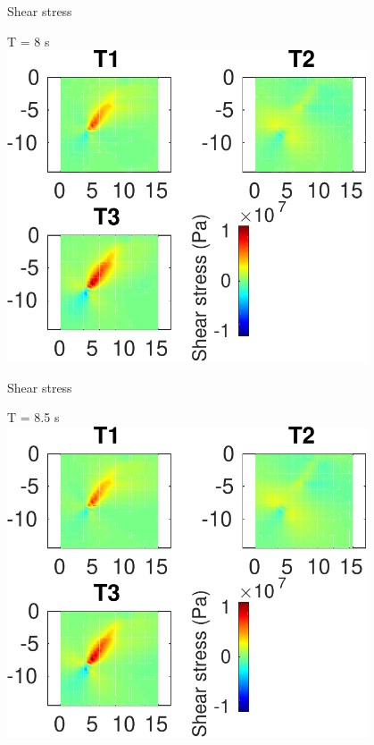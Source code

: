 \documentclass{beamer}
\begin{document}
\begin{frame}
 {Shear stress}
 
 \centering \Large T = 8 s\\
 \includegraphics[width=0.8\textwidth]{images/vertical_00086}
 
\end{frame}

\begin{frame}
 {Shear stress}
 
 \centering \Large T = 8.5 s\\
 \includegraphics[width=0.8\textwidth]{images/vertical_00091}
 
\end{frame}
\end{document}
